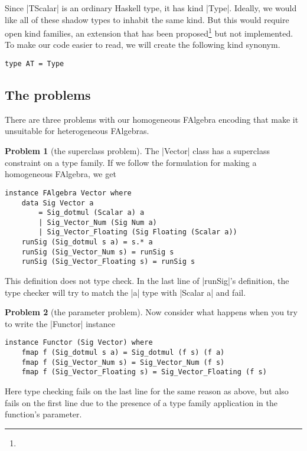 \documentclass[preprint]{sigplanconf}
\theoremstyle{definition}
\newtheorem{problem}{Problem}
\begin{document}
Since |TScalar| is an ordinary Haskell type, it has kind |Type|.
Ideally, we would like all of these shadow types to inhabit the same kind.
But this would require open kind families,
an extension that has been proposed\footnote{} but not implemented.
To make our code easier to read, we will create the following kind synonym.
\begin{lstlisting}
type AT = Type
\end{lstlisting}

\subsection{The problems}

There are three problems with our homogeneous FAlgebra encoding that make it unsuitable for heterogeneous FAlgebras.

\begin{problem}[the superclass problem]
The |Vector| class has a superclass constraint on a type family.
If we follow the formulation for making a homogeneous FAlgebra, we get
\begin{lstlisting}
instance FAlgebra Vector where
    data Sig Vector a
        = Sig_dotmul (Scalar a) a
        | Sig_Vector_Num (Sig Num a)
        | Sig_Vector_Floating (Sig Floating (Scalar a))
    runSig (Sig_dotmul s a) = s.* a
    runSig (Sig_Vector_Num s) = runSig s
    runSig (Sig_Vector_Floating s) = runSig s
\end{lstlisting}
This definition does not type check.
In the last line of |runSig|'s definition,
the type checker will try to match the |a| type with |Scalar a| and fail.
\end{problem}

\begin{problem}[the parameter problem]
Now consider what happens when you try to write the |Functor| instance
\begin{lstlisting}
instance Functor (Sig Vector) where
    fmap f (Sig_dotmul s a) = Sig_dotmul (f s) (f a)
    fmap f (Sig_Vector_Num s) = Sig_Vector_Num (f s)
    fmap f (Sig_Vector_Floating s) = Sig_Vector_Floating (f s)
\end{lstlisting}
Here type checking fails on the last line for the same reason as above,
but also fails on the first line due to the presence of a type family application in the function's parameter.
\end{problem}
\end{document}
